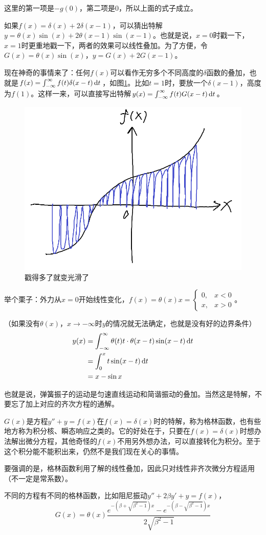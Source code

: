 这里的第一项是$-g(0)$，第二项是$0$，所以上面的式子成立。

如果$f(x)=\delta(x)+2 \delta(x-1)$，可以猜出特解$y=\theta(x) \sin(x)+2 \theta(x-1) \sin(x-1)$。也就是说，$x=0$时戳一下，$x=1$时更重地戳一下，两者的效果可以线性叠加。为了方便，令$G(x)=\theta(x) \sin(x)$，$y=G(x)+2 G(x-1)$。

现在神奇的事情来了：任何$f(x)$可以看作无穷多个不同高度的$\delta$函数的叠加，也就是$f(x)=\int_{-\infty}^{\infty} f(t) \delta(x-t) \mathop{}\!\mathrm{d} t$，如图\ref{fig-many-delta}。比如$t=1$时，要放一个$\delta(x-1)$，高度为$f(1)$。这样一来，可以直接写出特解$y(x)=\int_{-\infty}^{\infty} f(t) G(x-t) \mathop{}\!\mathrm{d} t$。
\begin{figure}[htb]
\centering
\includegraphics[width=0.33\linewidth]{fig/many-delta.png}
\caption{戳得多了就变光滑了}
\label{fig-many-delta}
\end{figure}

举个栗子：外力从$x=0$开始线性变化，$f(x)=\theta(x) x=\begin{cases} 0, &x<0 \\ x, &x>0 \end{cases}$。

（如果没有$\theta(x)$，$x \rightarrow -\infty$时$y$的情况就无法确定，也就是没有好的边界条件）
\begin{align*}
y(x)&=\int_{-\infty}^{\infty} \theta(t) t \cdot \theta(x-t) \sin(x-t) \mathop{}\!\mathrm{d} t \\
&=\int_{0}^{x} t \sin(x-t) \mathop{}\!\mathrm{d} t \\
&=x-\sin x
\end{align*}

也就是说，弹簧振子的运动是匀速直线运动和简谐振动的叠加。当然这是特解，不要忘了加上对应的齐次方程的通解。

$G(x)$是方程$y''+y=f(x)$在$f(x)=\delta(x)$时的特解，称为格林函数，也有些地方称为积分核、瞬态响应之类的。它的好处在于，只要在$f(x)=\delta(x)$时想办法解出微分方程，其他奇怪的$f(x)$不用另外想办法，可以直接转化为积分。至于这个积分能不能积出来，仍然不是我们现在关心的事情。

要强调的是，格林函数利用了解的线性叠加，因此只对线性非齐次微分方程适用（不一定是常系数）。

不同的方程有不同的格林函数，比如阻尼振动$y''+2 \beta y'+y=f(x)$，
\begin{equation*}
G(x)=\theta(x) \frac{e^{-(\beta+\sqrt{\beta^2-1}) x}-e^{-(\beta-\sqrt{\beta ^2-1}) x}}{2 \sqrt{\beta^2-1}}
\end{equation*}

